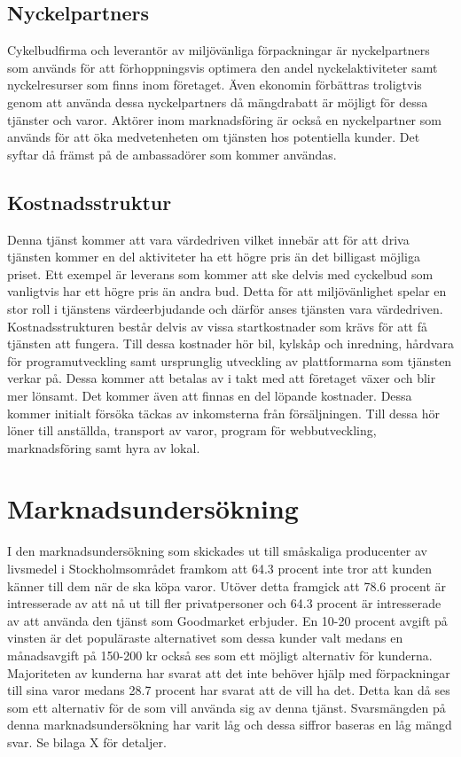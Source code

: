 \documentclass[10pt,a4paper,oneside]{article}
\begin{document}
\subsection{Nyckelpartners}
Cykelbudfirma och leverantör av miljövänliga förpackningar är nyckelpartners som används för att förhoppningsvis optimera den andel nyckelaktiviteter samt nyckelresurser som finns inom företaget. Även ekonomin förbättras troligtvis genom att använda dessa nyckelpartners då mängdrabatt är möjligt för dessa tjänster och varor. Aktörer inom marknadsföring är också en nyckelpartner som används för att öka medvetenheten om tjänsten hos potentiella kunder. Det syftar då främst på de ambassadörer som kommer användas. 

\subsection{Kostnadsstruktur}
Denna tjänst kommer att vara värdedriven vilket innebär att för att driva tjänsten kommer en del aktiviteter ha ett högre pris än det billigast möjliga priset. Ett exempel är leverans som kommer att ske delvis med cyckelbud som vanligtvis har ett högre pris än andra bud. Detta för att miljövänlighet spelar en stor roll i tjänstens värdeerbjudande och därför anses tjänsten vara värdedriven.\\ 

Kostnadsstrukturen består delvis av vissa startkostnader som krävs för att få tjänsten att fungera. Till dessa kostnader hör bil, kylskåp och inredning, hårdvara för programutveckling samt ursprunglig utveckling av plattformarna som tjänsten verkar på. Dessa kommer att betalas av i takt med att företaget växer och blir mer lönsamt. Det kommer även att finnas en del löpande kostnader. Dessa kommer initialt försöka täckas av inkomsterna från försäljningen. Till dessa hör löner till anställda, transport av varor, program för webbutveckling, marknadsföring samt hyra av lokal.  


\newpage

\section{Marknadsundersökning}
I den marknadsundersökning som skickades ut till småskaliga producenter av livsmedel i Stockholmsområdet framkom att 64.3 procent inte tror att kunden känner till dem när de ska köpa varor. Utöver detta framgick att 78.6 procent är intresserade av att nå ut till fler privatpersoner och 64.3 procent är intresserade av att använda den tjänst som Goodmarket erbjuder. En 10-20 procent avgift på vinsten är det populäraste alternativet som dessa kunder valt medans en månadsavgift på 150-200 kr också ses som ett möjligt alternativ för kunderna. Majoriteten av kunderna har svarat att det inte behöver hjälp med förpackningar till sina varor medans 28.7 procent har svarat att de vill ha det. Detta kan då ses som ett alternativ för de som vill använda sig av denna tjänst. Svarsmängden på denna marknadsundersökning har varit låg och dessa siffror baseras en låg mängd svar. Se bilaga X för detaljer. 
\end{document}
